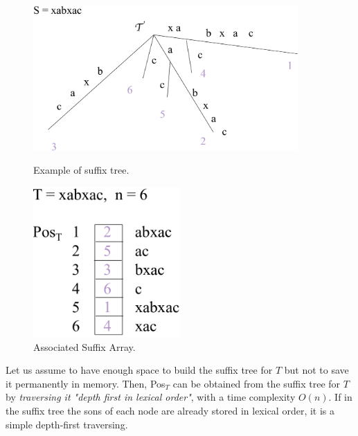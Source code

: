 \begin{figure}[h]
	\begin{minipage}[t]{0.5\linewidth}
		\centering
		\includegraphics[width=0.9\textwidth]{img/suffix_tree.png}
		\caption{Example of suffix tree.}
		\label{f1}
	\end{minipage}
	\hspace{0.1cm}
	\begin{minipage}[t]{0.5\linewidth} 
		\centering
		\includegraphics[width=0.5\textwidth]{img/suffix_array.png}
		\caption{Associated Suffix Array.}
		\label{f2}
	\end{minipage}        
\end{figure} 

Let us assume to have enough space to build the suffix tree for $T$ but not to save it permanently in memory. Then, Pos$_T$ can be obtained from the suffix tree for $T$ by \textit{traversing it "depth first in lexical order"}, with a time complexity $O(n)$. If in the suffix tree the sons of each node are already stored in lexical order, it is a simple depth-first traversing.

